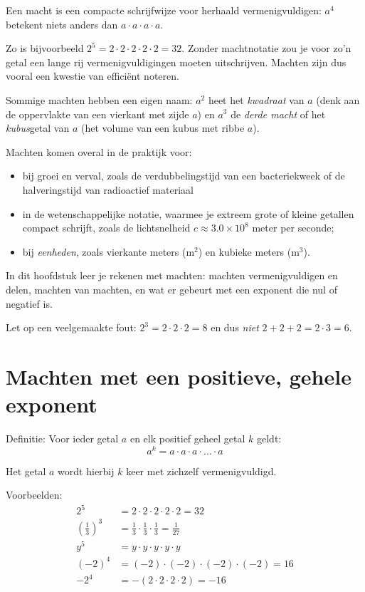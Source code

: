Een macht is een compacte schrijfwijze voor herhaald vermenigvuldigen: 
$a^4$ betekent niets anders dan $a \cdot a \cdot a \cdot a$. 

Zo is bijvoorbeeld $2^5 = 2 \cdot 2 \cdot 2 \cdot 2 \cdot 2 = 32$. Zonder 
machtnotatie zou je voor zo'n getal een lange rij vermenigvuldigingen 
moeten uitschrijven. Machten zijn dus vooral een kwestie van effici\"ent noteren.

Sommige machten hebben een eigen naam: $a^2$ heet het \emph{kwadraat} 
van $a$ (denk aan de oppervlakte van een vierkant met zijde $a$) en 
$a^3$ de \emph{derde macht} of het \emph{kubus}getal van $a$ (het 
volume van een kubus met ribbe $a$).

Machten komen overal in de praktijk voor:
\begin{itemize}
    \item bij groei en verval, zoals de verdubbelingstijd van 
    een bacteriekweek of de halveringstijd van radioactief materiaal
    \item in de wetenschappelijke notatie, waarmee je extreem 
    grote of kleine getallen compact schrijft, zoals de 
    lichtsnelheid $c \approx 3.0 \times 10^8$ meter per seconde;
    \item bij \emph{eenheden}, zoals vierkante meters ($\text{m}^2$) 
    en kubieke meters ($\text{m}^3$).
\end{itemize}

In dit hoofdstuk leer je rekenen met machten: machten vermenigvuldigen 
en delen, machten van machten, en wat er gebeurt met een exponent die 
nul of negatief is. 

Let op een veelgemaakte fout: $2^3 = 2 \cdot 2 \cdot 2 = 8$ en dus 
\emph{niet} $2+2+2 = 2 \cdot 3 = 6$.

\section{Machten met een positieve, gehele exponent}

Definitie: Voor ieder getal $a$ en elk positief geheel getal $k$ geldt: 
\[
    a^k=a\cdot a\cdot a\cdot \dotsc \cdot a
\]

Het getal $a$ wordt hierbij $k$ keer met zichzelf vermenigvuldigd.

Voorbeelden:
\begin{align*}
2^5    &= 2 \cdot 2 \cdot 2 \cdot 2 \cdot 2 = 32 \\
\left(\tfrac{1}{3}\right)^3 &= \tfrac{1}{3} \cdot \tfrac{1}{3} \cdot \tfrac{1}{3} = \tfrac{1}{27} \\
y^5    &= y \cdot y \cdot y \cdot y \cdot y \\
(-2)^4 &= (-2) \cdot (-2) \cdot (-2) \cdot (-2) = 16 \\
-2^4   &= -(2 \cdot 2 \cdot 2 \cdot 2) = -16
\end{align*}

